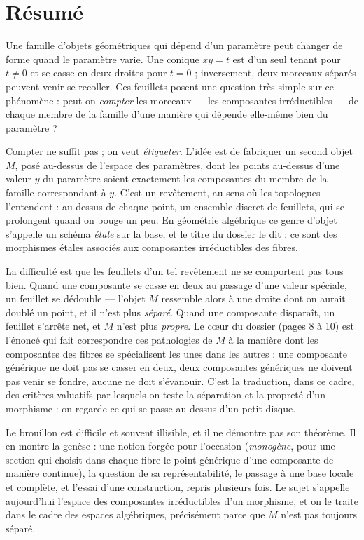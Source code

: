 \documentclass[11pt,a4paper]{article}
\begin{document}
\section*{Résumé}

\begin{resume}
Une famille d'objets géométriques qui dépend d'un paramètre peut changer de
forme quand le paramètre varie. Une conique $xy = t$ est d'un seul tenant pour
$t \neq 0$ et se casse en deux droites pour $t = 0$ ; inversement, deux
morceaux séparés peuvent venir se recoller. Ces feuillets posent une question
très simple sur ce phénomène : peut-on \emph{compter} les morceaux --- les
composantes irréductibles --- de chaque membre de la famille d'une manière qui
dépende elle-même bien du paramètre ?

Compter ne suffit pas ; on veut \emph{étiqueter}. L'idée est de fabriquer un
second objet $M$, posé au-dessus de l'espace des paramètres, dont les points
au-dessus d'une valeur $y$ du paramètre soient exactement les composantes du
membre de la famille correspondant à $y$. C'est un revêtement, au sens où les
topologues l'entendent : au-dessus de chaque point, un ensemble discret de
feuillets, qui se prolongent quand on bouge un peu. En géométrie algébrique ce
genre d'objet s'appelle un schéma \emph{étale} sur la base, et le titre du
dossier le dit : ce sont des morphismes étales associés aux composantes
irréductibles des fibres.

La difficulté est que les feuillets d'un tel revêtement ne se comportent pas
tous bien. Quand une composante se casse en deux au passage d'une valeur
spéciale, un feuillet se dédouble --- l'objet $M$ ressemble alors à une droite
dont on aurait doublé un point, et il n'est plus \emph{séparé}. Quand une
composante disparaît, un feuillet s'arrête net, et $M$ n'est plus
\emph{propre}. Le cœur du dossier (pages 8 à 10) est l'énoncé qui fait
correspondre ces pathologies de $M$ à la manière dont les composantes des
fibres se spécialisent les unes dans les autres : une composante générique ne
doit pas se casser en deux, deux composantes génériques ne doivent pas venir
se fondre, aucune ne doit s'évanouir. C'est la traduction, dans ce cadre, des
critères valuatifs par lesquels on teste la séparation et la propreté d'un
morphisme : on regarde ce qui se passe au-dessus d'un petit disque.

Le brouillon est difficile et souvent illisible, et il ne démontre pas son
théorème. Il en montre la genèse : une notion forgée pour l'occasion
(\emph{monogène}, pour une section qui choisit dans chaque fibre le point
générique d'une composante de manière continue), la question de sa
représentabilité, le passage à une base locale et complète, et l'essai d'une
construction, repris plusieurs fois. Le sujet s'appelle aujourd'hui l'espace
des composantes irréductibles d'un morphisme, et on le traite dans le cadre des
espaces algébriques, précisément parce que $M$ n'est pas toujours séparé.

\end{resume}
\end{document}
